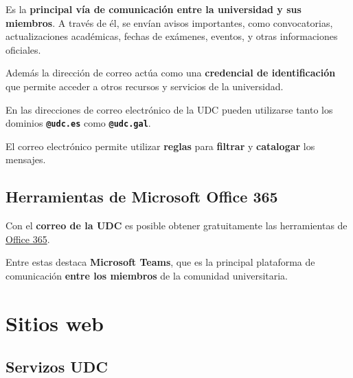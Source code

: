 Es la \textbf{principal vía de comunicación entre la universidad y sus miembros}. A través de él, se envían avisos importantes, como convocatorias, actualizaciones académicas, fechas de exámenes, eventos, y otras informaciones oficiales.

Además la dirección de correo actúa como una \textbf{credencial de identificación} que permite acceder a otros recursos y servicios de la universidad.

\begin{curiosityBox}
    En las direcciones de correo electrónico de la \acrshort{UDC} pueden utilizarse tanto los dominios \textbf{\texttt{@udc.es}} como \textbf{\texttt{@udc.gal}}.
\end{curiosityBox}

\begin{rememberBox}
    El correo electrónico permite utilizar \textbf{reglas} para \textbf{filtrar} y \textbf{catalogar} los mensajes. 
\end{rememberBox}

\subsection{Herramientas de Microsoft Office 365}

Con el \textbf{correo de la \acrshort{UDC}} es posible obtener gratuitamente las herramientas de \href{https://www.office.com/}{Office 365}.

\FloatBarrier
\begin{figure}[htp]
    \centering
\end{figure}
\FloatBarrier

Entre estas destaca \textbf{Microsoft Teams}, que es la principal plataforma de comunicación \textbf{entre los miembros} de la comunidad universitaria.


\section{Sitios web}

\subsection{Servizos UDC}

